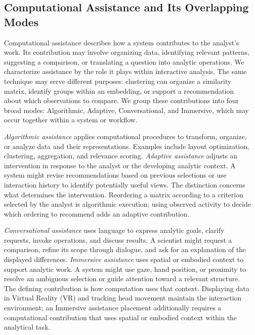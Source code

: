 \subsection{Computational Assistance and Its Overlapping Modes}
\label{subsection:assistancemodes}

Computational assistance describes how a system contributes to the analyst's work. Its contribution may involve organizing data, identifying relevant patterns, suggesting a comparison, or translating a question into analytic operations. We characterize assistance by the role it plays within interactive analysis. The same technique may serve different purposes: clustering can organize a similarity matrix, identify groups within an embedding, or support a recommendation about which observations to compare. We group these contributions into four broad modes: Algorithmic, Adaptive, Conversational, and Immersive, which may occur together within a system or workflow.

\emph{Algorithmic assistance} applies computational procedures to transform, organize, or analyze data and their representations. Examples include layout optimization, clustering, aggregation, and relevance scoring. \emph{Adaptive assistance} adjusts an intervention in response to the analyst or the developing analytic context. A system might revise recommendations based on previous selections or use interaction history to identify potentially useful views. The distinction concerns what determines the intervention. Reordering a matrix according to a criterion selected by the analyst is algorithmic execution; using observed activity to decide which ordering to recommend adds an adaptive contribution.

\emph{Conversational assistance} uses language to express analytic goals, clarify requests, invoke operations, and discuss results. A scientist might request a comparison, refine its scope through dialogue, and ask for an explanation of the displayed differences. \emph{Immersive assistance} uses spatial or embodied context to support analytic work. A system might use gaze, hand position, or proximity to resolve an ambiguous selection or guide attention toward a relevant structure. The defining contribution is how computation uses that context. Displaying data in Virtual Reality (VR) and tracking head movement maintain the interaction environment; an Immersive assistance placement additionally requires a computational contribution that uses spatial or embodied context within the analytical task.

